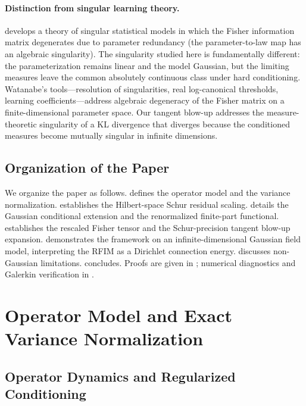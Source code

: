 \documentclass[11pt]{amsart}
\theoremstyle{plain}
\theoremstyle{definition}
\theoremstyle{remark}
\begin{document}
\paragraph{Distinction from singular learning theory.}
\cite{watanabe2009algebraic} develops a theory of singular statistical models in which the Fisher information matrix degenerates due to parameter redundancy (the parameter-to-law map has an algebraic singularity). The singularity studied here is fundamentally different: the parameterization remains linear and the model Gaussian, but the limiting measures leave the common absolutely continuous class under hard conditioning. Watanabe's tools---resolution of singularities, real log-canonical thresholds, learning coefficients---address algebraic degeneracy of the Fisher matrix on a finite-dimensional parameter space. Our tangent blow-up addresses the measure-theoretic singularity of a KL divergence that diverges because the conditioned measures become mutually singular in infinite dimensions.

\subsection{Organization of the Paper}
We organize the paper as follows.  defines the operator model and the variance normalization.  establishes the Hilbert-space Schur residual scaling.  details the Gaussian conditional extension and the renormalized finite-part functional.  establishes the rescaled Fisher tensor and the Schur-precision tangent blow-up expansion.  demonstrates the framework on an infinite-dimensional Gaussian field model, interpreting the RFIM as a Dirichlet connection energy.  discusses non-Gaussian limitations.  concludes. Proofs are given in ; numerical diagnostics and Galerkin verification in .
\section{Operator Model and Exact Variance Normalization}
\label{sec:setup}

\subsection{Operator Dynamics and Regularized Conditioning}
\label{sec:setup:dynamics}
\end{document}
